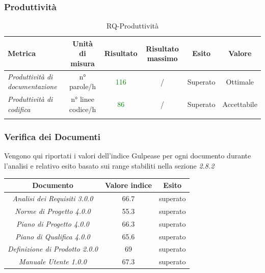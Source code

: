 {    \subsubsection{Produttività}
    
    \begin{longtable}{|>{\centering}m{2cm}|c|c|c|c|c|}
    	\hline
    	\textbf{Metrica} & \textbf{Unità di misura} & \textbf{Risultato} & \textbf{Risultato massimo} & \textbf{Esito} & \textbf{Valore}\\
    	\hline
    	\endhead
    	
    		\emph{Produttività di documentazione} & {n° parole/h} & \textcolor{Green}{116} & / & Superato & Ottimale \\ \hline
    	
   
    		
    		\emph{Produttività di codifica} & {n° linee codice/h} & \textcolor{Green}{86} & / & Superato & Accettabile \\ \hline
    		
   
	    	
    	  	\caption{RQ-Produttività}\\
    	  \end{longtable}
    	  
	
	
   \subsubsection{Verifica dei Documenti}
    Vengono qui riportati i valori dell'indice Gulpease per ogni documento durante l’analisi e relativo
    esito basato sui range stabiliti nella sezione \emph{2.8.2}
    \begin{center}
    	\begin{tabular}{|c|c|c|}
    		\hline
    		\textbf{Documento} & \textbf{Valore indice} & \textbf{Esito} \\
    		\hline
    		\emph{Analisi dei Requisiti 3.0.0}  & 66.7 & superato \\
    		\hline
    		\emph{Norme di Progetto 4.0.0}   & 55.3  & superato \\
    		\hline
    		\emph{Piano di Progetto 4.0.0}   & 66.3 & superato \\
    		\hline
    		\emph{Piano di Qualifica 4.0.0}   & 65.6 & superato \\
    		
    		\hline
    		\emph{Definizione di Prodotto 2.0.0}  & 69 & superato \\
    		\hline
    			\emph{Manuale Utente 1.0.0}  & 67.3 & superato \\
    			\hline
    	\end{tabular}
    \end{center}
  
}
